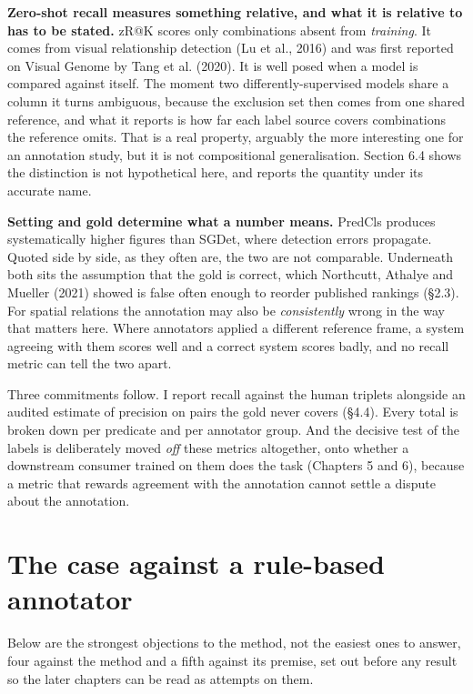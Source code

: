 \textbf{Zero-shot recall measures something relative, and what it is relative to has to be stated.} zR@K scores only combinations absent from \textit{training}. It comes from visual relationship detection (Lu et al., 2016) and was first reported on Visual Genome by Tang et al. (2020). It is well posed when a model is compared against itself. The moment two differently-supervised models share a column it turns ambiguous, because the exclusion set then comes from one shared reference, and what it reports is how far each label source covers combinations the reference omits. That is a real property, arguably the more interesting one for an annotation study, but it is not compositional generalisation. Section 6.4 shows the distinction is not hypothetical here, and reports the quantity under its accurate name.

\textbf{Setting and gold determine what a number means.} PredCls produces systematically higher figures than SGDet, where detection errors propagate. Quoted side by side, as they often are, the two are not comparable. Underneath both sits the assumption that the gold is correct, which Northcutt, Athalye and Mueller (2021) showed is false often enough to reorder published rankings (\S{}2.3). For spatial relations the annotation may also be \textit{consistently} wrong in the way that matters here. Where annotators applied a different reference frame, a system agreeing with them scores well and a correct system scores badly, and no recall metric can tell the two apart.

Three commitments follow. I report recall against the human triplets alongside an audited estimate of precision on pairs the gold never covers (\S{}4.4). Every total is broken down per predicate and per annotator group. And the decisive test of the labels is deliberately moved \textit{off} these metrics altogether, onto whether a downstream consumer trained on them does the task (Chapters 5 and 6), because a metric that rewards agreement with the annotation cannot settle a dispute about the annotation.

\section{The case against a rule-based annotator}

Below are the strongest objections to the method, not the easiest ones to answer, four against the method and a fifth against its premise, set out before any result so the later chapters can be read as attempts on them.

